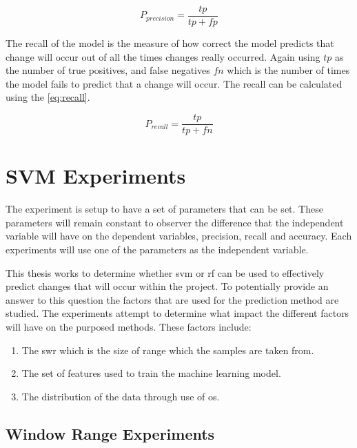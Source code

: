 \begin{equation} 
\label{eq:precision}
P_{precision} = \frac{tp}{tp+fp}
\end{equation}

The recall of the model is the measure of how correct the model predicts that change will occur out of all the times changes really occurred. Again using $tp$ as the number of true positives, and false negatives $fn$ which is the number of times the model fails to predict that a change will occur. The recall can be calculated using the \autoref{eq:recall}.

\begin{equation} 
\label{eq:recall}
P_{recall} = \frac{tp}{tp+fn}
\end{equation}

\section{SVM Experiments}
\label{sec:svm_experiments}

The experiment is setup to have a set of parameters that can be set. These parameters will remain constant to observer the difference that the independent variable will have on the dependent variables, precision, recall and accuracy. Each experiments will use one of the parameters as the independent variable.

This thesis works to determine whether \gls{svm} or \gls{rf} can be used to effectively predict changes that will occur within the project. To potentially provide an answer to this question the factors that are used for the prediction method are studied. The experiments attempt to determine what impact the different factors will have on the purposed methods. These factors include:
\begin{enumerate}
\item The \gls{swr} which is the size of range which the samples are taken from.
\item The set of features used to train the machine learning model.
\item The distribution of the data through use of \gls{os}.
\end{enumerate}


\subsection{Window Range Experiments}
\label{sec:svm_swr_experiment}

